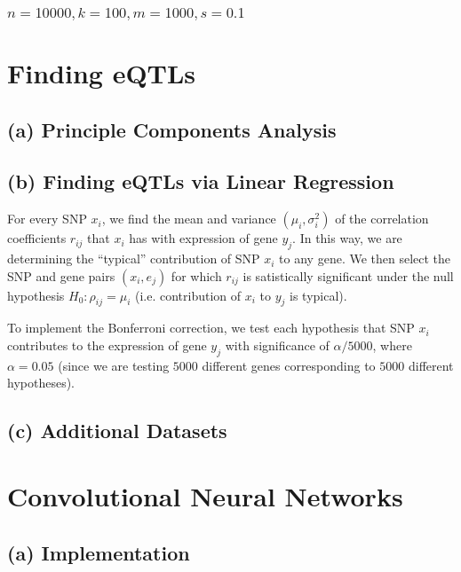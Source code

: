 \documentclass{article}[11pt]
\begin{document}
\subsubsection{$n = 10000, k = 100, m = 1000, s = 0.1$}

\section{Finding eQTLs}

\subsection*{(a) Principle Components Analysis}

\subsection*{(b) Finding eQTLs via Linear Regression}
For every SNP $x_i$, we find the mean and variance
$(\mu_{i}, \sigma_{i}^2)$ of the correlation coefficients $r_{ij}$ that 
$x_i$ has with expression of gene $y_j$. In this way, we are determining
the ``typical'' contribution of SNP $x_i$ to any gene.
We then select the SNP and gene pairs $(x_i, e_j)$ for which
$r_{ij}$ is satistically significant
under the null hypothesis $H_0: \rho_{ij} = \mu_{i}$ (i.e. contribution
of $x_i$ to $y_j$ is typical).

To implement the Bonferroni correction, we test
each hypothesis that SNP $x_i$ contributes
to the expression of gene $y_j$ with significance
of $\alpha / 5000$, where $\alpha = 0.05$ (since we are testing
$5000$ different genes corresponding to $5000$ different hypotheses).

\subsection*{(c) Additional Datasets}

\section{Convolutional Neural Networks}
\subsection*{(a) Implementation}
\end{document}
